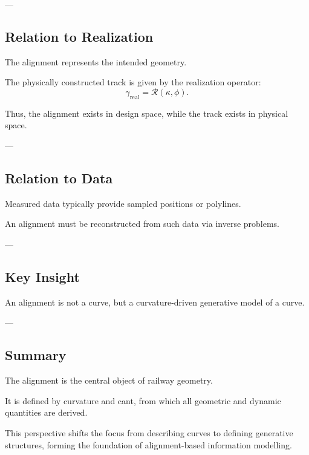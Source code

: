 ---

\subsection{Relation to Realization}

\begin{remark}
The alignment represents the intended geometry.
\end{remark}

\begin{remark}
The physically constructed track is given by the realization operator:
\[
\gamma_{\mathrm{real}} = \mathcal{R}(\kappa, \phi).
\]
\end{remark}

\begin{remark}
Thus, the alignment exists in design space, while the track exists in
physical space.
\end{remark}

---

\subsection{Relation to Data}

\begin{remark}
Measured data typically provide sampled positions or polylines.
\end{remark}

\begin{remark}
An alignment must be reconstructed from such data via inverse
problems.
\end{remark}

---

\subsection{Key Insight}

\begin{proposition}
An alignment is not a curve, but a curvature-driven generative model of
a curve.
\end{proposition}

---

\subsection{Summary}

\begin{summary}
The alignment is the central object of railway geometry.

It is defined by curvature and cant, from which all geometric and
dynamic quantities are derived.

This perspective shifts the focus from describing curves to defining
generative structures, forming the foundation of
alignment-based information modelling.
\end{summary}
